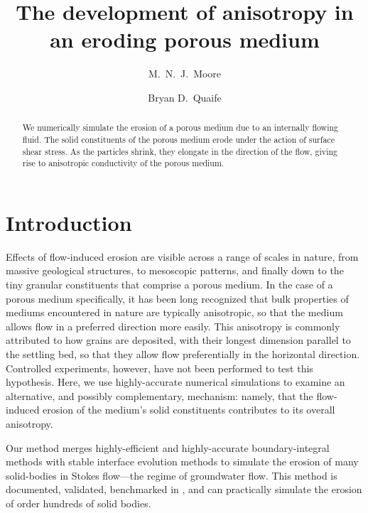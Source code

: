 \documentclass[reprint,superscriptaddress,notitlepage]{revtex4-1}
\begin{document}
\title{The development of anisotropy in an eroding porous medium}
%
\author{M.~N.~J.~Moore}
\author{Bryan D.~Quaife}
\begin{abstract}
We numerically simulate the erosion of a porous medium due to an internally flowing fluid. The solid constituents of the porous medium erode under the action of surface shear stress. As the particles shrink, they elongate in the direction of the flow, giving rise to anisotropic conductivity of the porous medium.
\end{abstract}
\maketitle

\section{Introduction}

Effects of flow-induced erosion are visible across a range of scales in nature, from massive geological structures, to mesoscopic patterns, and finally down to the tiny granular constituents that comprise a porous medium. In the case of a porous medium specifically, it has been long recognized that bulk properties of mediums encountered in nature are typically anisotropic, so that the medium allows flow in a preferred direction more easily. This anisotropy is commonly attributed to how grains are deposited, with their longest dimension parallel to the settling bed, so that they allow flow preferentially in the horizontal direction. Controlled experiments, however, have not been performed to test this hypothesis. Here, we use highly-accurate numerical simulations to examine an alternative, and possibly complementary, mechanism: namely, that the flow-induced erosion of the medium's solid constituents contributes to its overall anisotropy.

Our method merges highly-efficient and highly-accurate boundary-integral methods with stable interface evolution methods to simulate the erosion of many solid-bodies in Stokes flow---the regime of groundwater flow. This method is documented, validated, benchmarked in \cite{quaife2018boundary}, and can practically simulate the erosion of order hundreds of solid bodies.
\end{document}

